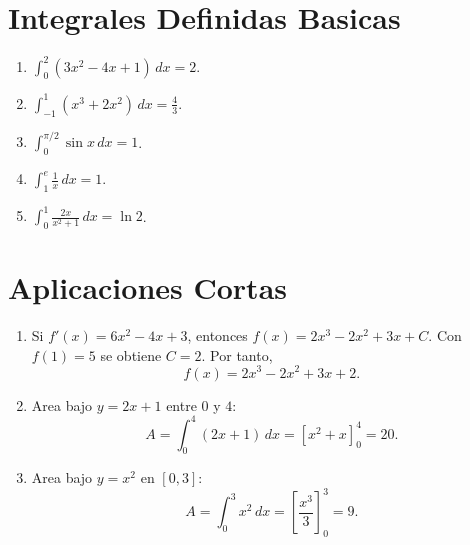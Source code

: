 \documentclass[12pt,a4paper]{article}
\begin{document}
\section{Integrales Definidas Basicas}
\begin{enumerate}
    \item $\int_0^2 (3x^2-4x+1)\,dx = 2$.
    \item $\int_{-1}^{1} (x^3+2x^2)\,dx = \frac{4}{3}$.
    \item $\int_0^{\pi/2} \sin x\,dx = 1$.
    \item $\int_1^{e} \frac{1}{x}\,dx = 1$.
    \item $\int_0^1 \frac{2x}{x^2+1}\,dx = \ln 2$.
\end{enumerate}

\section{Aplicaciones Cortas}
\begin{enumerate}
    \item Si $f'(x)=6x^2-4x+3$, entonces $f(x)=2x^3-2x^2+3x+C$. Con $f(1)=5$ se obtiene $C=2$. Por tanto,
    $$f(x)=2x^3-2x^2+3x+2.$$

    \item Area bajo $y=2x+1$ entre $0$ y $4$:
    $$A=\int_0^4 (2x+1)\,dx = [x^2+x]_0^4 = 20.$$

    \item Area bajo $y=x^2$ en $[0,3]$:
    $$A=\int_0^3 x^2\,dx = \left[\frac{x^3}{3}\right]_0^3 = 9.$$
\end{enumerate}
\end{document}
